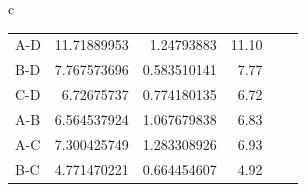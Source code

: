 \begin{figure}[p]
\begin{center}
\begin{tabular}{c}
\begin{minipage}{0.68\hsize}
\begin{center}
\begin{tabular}{l|rrrrr}
            \hline
            {\footnotesize A-D }&{\footnotesize 11.71889953}&{\footnotesize 1.24793883}&{\footnotesize 11.10 }\\
            {\footnotesize B-D }&{\footnotesize 7.767573696}&{\footnotesize 0.583510141}&{\footnotesize 7.77 }\\
            {\footnotesize C-D }&{\footnotesize 6.72675737}&{\footnotesize 0.774180135}&{\footnotesize 6.72 }\\
            {\footnotesize A-B }&{\footnotesize 6.564537924}&{\footnotesize 1.067679838}&{\footnotesize 6.83 }\\
            {\footnotesize A-C }&{\footnotesize 7.300425749}&{\footnotesize 1.283308926}&{\footnotesize 6.93 }\\
            {\footnotesize B-C }&{\footnotesize 4.771470221}&{\footnotesize 0.664454607}&{\footnotesize 4.92 }\\
            \hline
          \end{tabular}
          \label{tab:__estdistance}
        \end{center}
      \end{minipage}
    \end{tabular}
  \end{center}
\end{figure}
